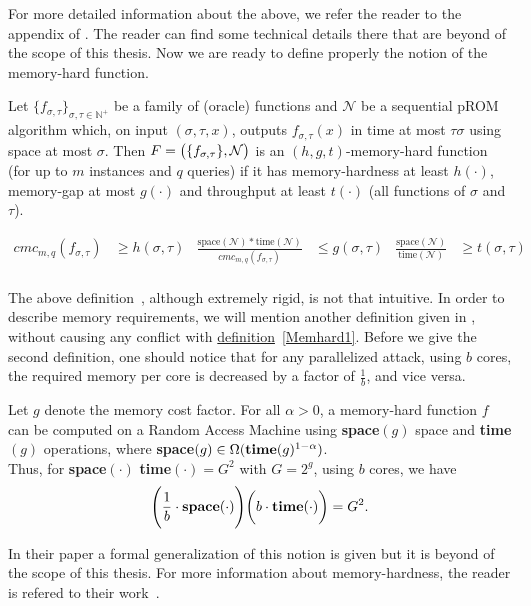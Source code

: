 For more detailed information about the above, we refer the reader to the appendix of \cite{cryptoeprint:2016:875}. The reader can find some technical details there that are beyond of the scope of this thesis. Now we are ready to define properly the notion of the memory-hard function.
\pagebreak

\begin{definition} \label{Memhard1}
  Let $\{ f_{\sigma, \tau} \}_{\sigma, \tau \in \mathbb{N}^{+}}$ be a family of (oracle) functions and $\mathcal{N}$ be a sequential pROM algorithm which, on input $(\sigma, \tau, x)$, outputs $f_{\sigma, \tau}(x)$ in time at most $\tau \sigma$ using space at most $\sigma$. Then $F=\big{(} \{ f_{\sigma,\tau} \}, \mathcal{N} \big{)}$
  is an $(h,g,t)$-memory-hard function (for up to $m$ instances and $q$ queries) if it has memory-hardness at least $h(\cdot)$, memory-gap at most $g(\cdot)$ and throughput at least $t(\cdot)$ (all functions of $\sigma$ and $\tau$).

\begin{align*}
cmc_{m,q}(f_{\sigma, \tau})&\geq h(\sigma, \tau)           &  \frac{\mbox{space}(\mathcal{N})*\mbox{time}(\mathcal{N})}{cmc_{m,q}(f_{\sigma, \tau})} &\leq g(\sigma, \tau)             &  \frac{\mbox{space}(\mathcal{N})}{\mbox{time}(\mathcal{N})} &\geq t(\sigma, \tau)\\
\end{align*}
%
\end{definition}

The above definition~\cite{cryptoeprint:2016:875}, although extremely rigid, is not that intuitive. In order to describe memory requirements, we will mention another definition given in \cite{ForlerLW13}, without causing any conflict with \hyperref[Memhard1]{definition}~\ref{Memhard1}. Before we give the second definition, one should notice that for any parallelized attack, using $b$ cores, the required memory per core is decreased by a factor of $\frac{1}{b}$, and vice versa.

\begin{definition}
  Let $g$ denote the memory cost factor. For all $\alpha > 0$, a memory-hard function $f$ can be computed on a Random Access Machine using \textbf{space}$(g)$ space and \textbf{time}$(g)$ operations, where \textbf{space}$(g) \in \Omega(\mbox{\textbf{time}}(g)^{1-\alpha})$.\\

  \noindent Thus, for \textbf{space}$(\cdot)$ \textbf{time}$(\cdot)$\:$=G^2$ with $G=2^g$, using $b$ cores, we have
  \begin{equation} \label{eqn:memhard}
    \Bigg{(} \frac{1}{b} \cdot \mbox{\textbf{space}}(\cdot) \Bigg{)} \bigg{(} b \cdot \mbox{\textbf{time}}(\cdot) \bigg{)} = G^2.
  \end{equation}
\end{definition}
In their paper a formal generalization of this notion is given but it is beyond of the scope of this thesis. For more information about memory-hardness, the reader is refered to their work~\cite{ForlerLW13}.
%
